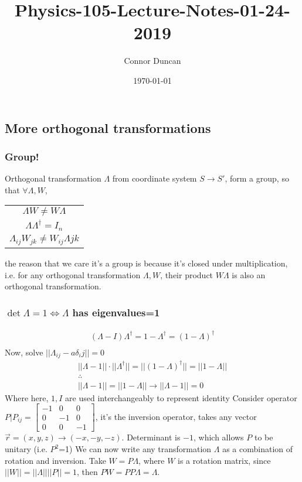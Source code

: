 \documentclass{article} \usepackage{amsmath} \usepackage{amssymb} \usepackage{amsthm} \usepackage[margin=0.2in]{geometry} \usepackage{hyperref} \usepackage{physics} \usepackage{tikz} \usepackage{mathtools} \mathtoolsset{showonlyrefs} \theoremstyle{definition} \newtheorem{theorem}{Theorem}[section] \newtheorem{corollary}{Corollary}[theorem] \newtheorem{lemma}[theorem]{Lemma} \newtheorem{definition}{Definition}[section] \author{Connor Duncan} \date{\today}
\title{Physics-105-Lecture-Notes-01-24-2019}
\begin{document}
\maketitle\tableofcontents
\noindent{}
\subsection{More orthogonal transformations} \subsubsection{Group!} Orthogonal transformation $\Lambda$ from coordinate system $S\rightarrow S'$, form a group, so that $\forall \Lambda, W$, \begin{center} \begin{tabular}{c} $\Lambda W\neq W\Lambda$\\ $\Lambda\Lambda^\dag=I_n$\\ $\Lambda_{ij}W_{jk}\neq W_{ij}\Lambda{jk}$ \end{tabular} \end{center} the reason that we care it's a group is because it's closed under multiplication, i.e. for any orthogonal transformation $\Lambda, W$, their product $W\Lambda$ is also an orthogonal transformation. \subsubsection{$\det\Lambda=1\Leftrightarrow\Lambda$ has eigenvalues=1} \begin{align} (\Lambda-I)\Lambda^\dag=1-\Lambda^\dag=(1-\Lambda)^\dag\\ \end{align} Now, solve $||\Lambda_{ij}-a\delta_ij||=0$ \begin{align} ||\Lambda-1||\cdot||\Lambda^\dag||=||(1-\Lambda)^\dag||=||1-\Lambda||\\ \therefore\\ ||\Lambda-1||=||1-\Lambda||\rightarrow||\Lambda-1||=0 \end{align} Where here, $1,I$ are used interchangeably to represent identity Consider operator $P|P_{ij}=\begin{bmatrix}-1 &0&0\\0&-1&0\\0&0&-1\end{bmatrix}$, it's the inversion operator, takes any vector $\vec{r}=(x,y,z)\rightarrow(-x,-y,-z)$. Determinant is $-1$, which allows $P$ to be unitary (i.e. $P^2$=1) We can now write any transformation $\Lambda$ as a combination of rotation and inversion. Take $W=P\Lambda$, where $W$ is a rotation matrix, since $||W||=||\Lambda||||P||=1$, then $PW=PP\Lambda=\Lambda$. 
\end{document}
